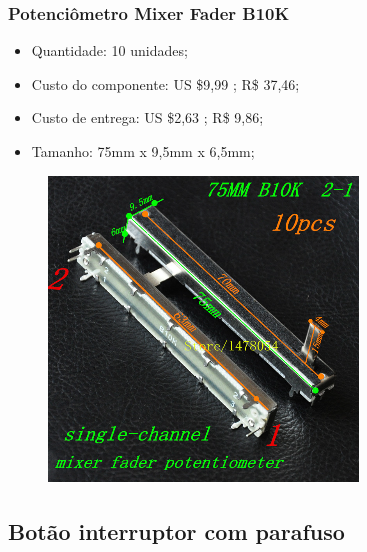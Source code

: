 \documentclass[hyperref={pdfpagelabels=false}]{beamer}
\begin{document}
        	\begin{frame}\frametitle{Potenciômetro Mixer Fader B10K}

      	          \begin{itemize}
       	             \item Quantidade: 10 unidades;
        	         \item Custo do componente: US \$9,99 ; R\$ 37,46;
    	             \item Custo de entrega: US \$2,63 ; R\$ 9,86;
    	             \item Tamanho: 75mm x 9,5mm x 6,5mm;
         	      \end{itemize}

            	  \begin{figure}
                        \includegraphics[scale=0.5]{Imagens/Apresentacao_2/mixerfader.png}
                  \end{figure}	

           	\end{frame}

        \subsection{Botão interruptor com parafuso}
\end{document}
